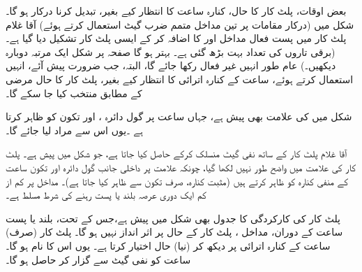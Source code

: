 بعض اوقات، پلٹ کار کا حال، کنارہ ساعت کا انتظار کیے بغیر، تبدیل کرنا درکار ہو گا۔شکل  میں (درکار مقامات پر تین مداخل متمم ضرب گیٹ استعمال کرتے ہوئے) آقا غلام پلٹ کار میں پست فعال مداخل  اور  کا اضافہ کر کے ایسی پلٹ کار تشکیل دیا گیا ہے۔ (برقی تاروں کی تعداد بہت بڑھ گئی ہے۔ بہتر ہو گا صفحہ  پر شکل  ایک مرتبہ دوبارہ دیکھیں۔) عام طور انہیں غیر فعال رکھا جائے گا، البتہ، جب ضرورت پیش آئے، انہیں استعمال کرتے ہوئے، ساعت کے کنارہ اترائی کا انتظار کیے بغیر، پلٹ کار کا حال مرضی کے مطابق منتخب کیا جا سکے گا۔

شکل میں  کی علامت بھی پیش ہے، جہاں ساعت  پر گول دائرہ ، اور تکون  کو ظاہر کرتا ہے ۔یوں اس سے مراد  لیا جائے گا۔


آقا غلام پلٹ کار کے ساتھ نفی گیٹ منسلک کرکے  حاصل کیا جاتا ہے، جو شکل  میں پیش ہے۔ پلٹ کار کی علامت میں  واضح طور نہیں لکھا گیا، چونکہ علامت پر داخلی جانب گول دائرہ اور تکون ساعت کے منفی کنارہ کو ظاہر کرتے ہیں (مثبت کنارہ، صرف تکون سے ظاہر کیا جاتا ہے)۔ مداخل  پر کم از کم ایک دوری عرصہ  بلند یا پست رہنے کی شرط مسلط ہے۔

 پلٹ کار کی کارکردگی کا جدول بھی شکل  میں پیش ہے،جس کے تحت، بلند یا پست ساعت کے دوران، مداخل ، پلٹ کار کے حال پر اثر انداز نہیں ہو گا۔ پلٹ کار (صرف) ساعت کے کنارہ اترائی پر  دیکھ کر (نیا) حال اختیار کرتا ہے۔ یوں اس کا نام  ہو گا۔ ساعت کو نفی گیٹ سے گزار کر  حاصل ہو گا۔

